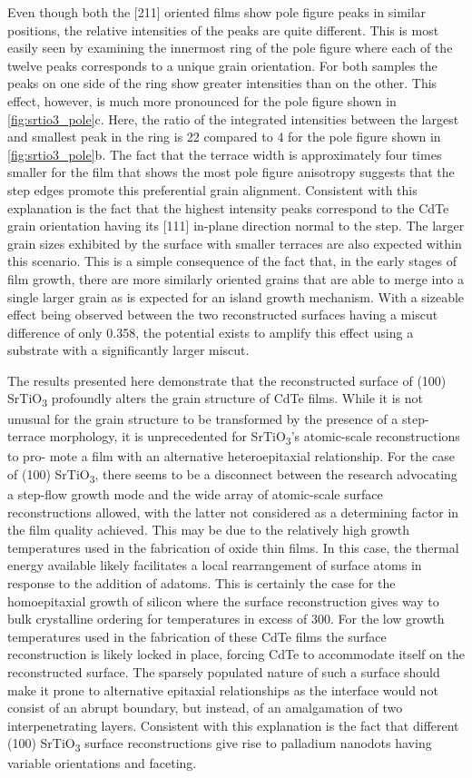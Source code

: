 Even though both the [211] oriented films show pole figure
peaks in similar positions, the relative intensities of the peaks are
quite different. This is most easily seen by examining the
innermost ring of the pole figure where each of the twelve peaks
corresponds to a unique grain orientation. For both samples the
peaks on one side of the ring show greater intensities than on the
other. This effect, however, is much more pronounced for the pole
figure shown in \cref{fig:srtio3_pole}c. Here, the ratio of the integrated intensities
between the largest and smallest peak in the ring is 22 compared to
4 for the pole figure shown in \cref{fig:srtio3_pole}b. The fact that the terrace
width is approximately four times smaller for the film that shows
the most pole figure anisotropy suggests that the step edges
promote this preferential grain alignment. Consistent with this
explanation is the fact that the highest intensity peaks correspond
to the CdTe grain orientation having its [111] in-plane direction
normal to the step. The larger grain sizes exhibited by the surface
with smaller terraces are also expected within this scenario. This is
a simple consequence of the fact that, in the early stages of film
growth, there are more similarly oriented grains that are able to
merge into a single larger grain as is expected for an island growth
mechanism. With a sizeable effect being observed between the two
reconstructed surfaces having a miscut difference of only 0.358, the
potential exists to amplify this effect using a substrate with a
significantly larger miscut.

The results presented here demonstrate that the reconstructed
surface of (100) SrTiO\textsubscript{3} profoundly alters the grain structure of
CdTe films. While it is not unusual for the grain structure to be
transformed by the presence of a step-terrace morphology, it is
unprecedented for SrTiO\textsubscript{3}’s atomic-scale reconstructions to pro-
mote a film with an alternative heteroepitaxial relationship. For
the case of (100) SrTiO\textsubscript{3}, there seems to be a disconnect between
the research advocating a step-flow growth mode and the wide
array of atomic-scale surface reconstructions allowed, with the
latter not considered as a determining factor in the film quality
achieved. This may be due to the relatively high growth
temperatures used in the fabrication of oxide thin films. In this
case, the thermal energy available likely facilitates a local
rearrangement of surface atoms in response to the addition of
adatoms. This is certainly the case for the homoepitaxial growth of
silicon where the surface reconstruction gives way to bulk
crystalline ordering for temperatures in excess of 300\celsius{}\cite{Gossmann1985}.
For the low growth temperatures used in the fabrication of these
CdTe films the surface reconstruction is likely locked in place,
forcing CdTe to accommodate itself on the reconstructed surface.
The sparsely populated nature of such a surface should make it
prone to alternative epitaxial relationships as the interface would
not consist of an abrupt boundary, but instead, of an amalgamation
of two interpenetrating layers. Consistent with this explanation is
the fact that different (100) SrTiO\textsubscript{3} surface reconstructions give
rise to palladium nanodots having variable orientations and
faceting\cite{Silly2005b}.
